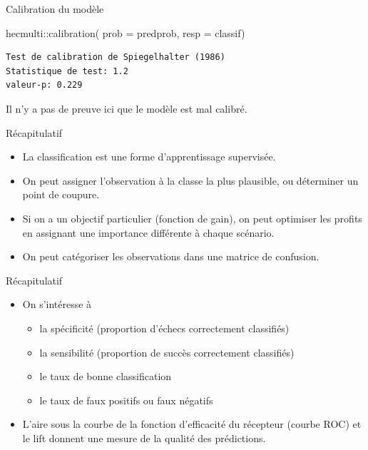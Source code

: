 \documentclass[
  ignorenonframetext,
]{beamer}
\newenvironment{Shaded}{\begin{snugshade}}{\end{snugshade}}
\newcommand{\AttributeTok}[1]{\textcolor[rgb]{0.40,0.45,0.13}{#1}}
\newcommand{\FunctionTok}[1]{\textcolor[rgb]{0.28,0.35,0.67}{#1}}
\newcommand{\NormalTok}[1]{\textcolor[rgb]{0.00,0.23,0.31}{#1}}
\newcommand{\SpecialCharTok}[1]{\textcolor[rgb]{0.37,0.37,0.37}{#1}}
\providecommand{\tightlist}{%
  \setlength{\itemsep}{0pt}\setlength{\parskip}{0pt}}\usepackage{longtable,booktabs,array}
\begin{document}
\begin{frame}[fragile]{Calibration du modèle}
\protect\hypertarget{calibration-du-moduxe8le-1}{}
\begin{Shaded}
\begin{Highlighting}[numbers=left,,]
\NormalTok{hecmulti}\SpecialCharTok{::}\FunctionTok{calibration}\NormalTok{(}
   \AttributeTok{prob =}\NormalTok{ predprob, }
   \AttributeTok{resp =}\NormalTok{ classif)}
\end{Highlighting}
\end{Shaded}

\begin{verbatim}
Test de calibration de Spiegelhalter (1986)
Statistique de test: 1.2 
valeur-p: 0.229
\end{verbatim}

Il n'y a pas de preuve ici que le modèle est mal calibré.
\end{frame}

\begin{frame}{Récapitulatif}
\protect\hypertarget{ruxe9capitulatif}{}
\begin{itemize}
\tightlist
\item
  La classification est une forme d'apprentissage supervisée.
\item
  On peut assigner l'observation à la classe la plus plausible, ou
  déterminer un point de coupure.
\item
  Si on a un objectif particulier (fonction de gain), on peut optimiser
  les profits en assignant une importance différente à chaque scénario.
\item
  On peut catégoriser les observations dans une matrice de confusion.
\end{itemize}
\end{frame}

\begin{frame}{Récapitulatif}
\protect\hypertarget{ruxe9capitulatif-1}{}
\begin{itemize}
\tightlist
\item
  On s'intéresse à

  \begin{itemize}
  \tightlist
  \item
    la spécificité (proportion d'échecs correctement classifiés)
  \item
    la sensibilité (proportion de succès correctement classifiés)
  \item
    le taux de bonne classification
  \item
    le taux de faux positifs ou faux négatifs
  \end{itemize}
\item
  L'aire sous la courbe de la fonction d'efficacité du récepteur (courbe
  ROC) et le lift donnent une mesure de la qualité des prédictions.
\end{itemize}
\end{frame}
\end{document}

